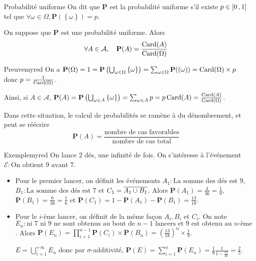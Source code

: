     \begin{defi}{Probabilité uniforme}{}
        On dit que $\mathbf{P}$ est la probabilité uniforme s’il existe $p \in \left[ 0 \, , 1 \right]$ tel que $\forall \omega \in \Omega, \mathbf{P}(\left\{\omega\right\}) = p$.
    \end{defi}

    \begin{theo}{}{}
        On suppose que $\mathbf{P}$ est une probabilité uniforme. Alors
        \[ \forall A \in \mathcal{A}, \quad \mathbf{P}(A) = \frac{\operatorname{Card}(A)}{\operatorname{Card}(\Omega)} \]   
    \end{theo}

    \begin{demo}{Preuve}{myred}
        On a $\mathbf{P}(\Omega) = 1 = \mathbf{P}\left(\bigcup_{\omega \in \Omega} \left\{\omega\right\}\right) = \sum_{\omega \in \Omega} \mathbf{P}(\left(\omega\right)) = \operatorname{Card}(\Omega) \times p$ donc $p = \frac{1}{\operatorname{Card}(\Omega)}$.

        Ainsi, si $A \in \mathcal{A}$, $\mathbf{P}(A) = \mathbf{P}\left(\bigcup_{\omega \in A} \left\{\omega\right\}\right) = \sum_{\omega \in A} p = p \operatorname{Card}(A) = \frac{\operatorname{Card}(A)}{\operatorname{Card}(\Omega)}$.
    \end{demo}

    Dans cette situation, le calcul de probabilités se ramène à du dénombrement, et peut se réécrire 
    \[ \mathbf{P}(A) = \frac{\text{nombre de cas favorables}}{\text{nombre de cas total}} \]   

    \begin{omed}{Exemple}{myred}
        On lance 2 dés, une infinité de fois. On s’intéresse à l’événement $\mathcal{E} : \text{On obtient 9 avant 7}$.
        \begin{itemize}
            \item Pour le premier lancer, on définit les événements $A_1 : \text{La somme des dés est 9}$, $B_1 : \text{La somme des dés est 7}$ et $C_1 = \overline{A_1 \cup B_1}$. Alors $\mathbf{P}(A_1) = \frac{4}{36} = \frac{1}{9}$, $\mathbf{P}(B_1) = \frac{6}{36} = \frac{1}{6}$ et $\mathbf{P}(C_1) = 1 - \mathbf{P}(A_1)- \mathbf{P}(B_1) = \frac{13}{18}$. 
            \item Pour le $i$-ème lancer, on définit de la même façon $A_i, B_i$ et $C_i$. On note $E_n : \text{ni 7 ni 9 ne sont obtenus au bout de } n-1 \text{ lancers et 9 est obtenu au } n\text{-ème}$. Alors $\mathbf{P}(E_n) = \prod_{i=1}^{n-1} \mathbf{P}(C_i) \times \mathbf{P}(B_n) = \left(\frac{13}{18}\right)^n \times \frac{1}{9}$. 
             
            $E = \bigcup_{i = 1}^{+\infty} E_n$ donc par $\sigma$-additivité, $\mathbf{P}(E) = \sum_{i=1}^n \mathbf{P}(E_n) = \frac{1}{9} \frac{1}{1 - \frac{13}{18}} = \frac{2}{5}$.
        \end{itemize}
    \end{omed}

